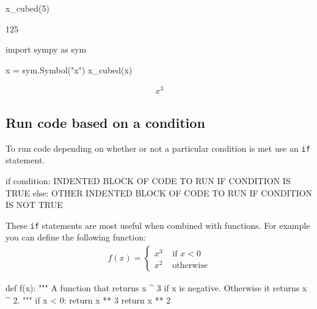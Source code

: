 \begin{pyin}
x_cubed(5)
\end{pyin}





\begin{raw}
125
\end{raw}







\begin{pyin}
import sympy as sym

x = sym.Symbol("x")
x_cubed(x)
\end{pyin}




\begin{equation*}
\begin{split}\displaystyle x^{3}\end{split}
\end{equation*}




\subsection{Run code based on a condition}
\label{\detokenize{tools-for-mathematics/06-probability/how/main:conditional-running-of-code}}

To run code depending on whether or not a particular condition is met use
an \texttt{if} statement.


\begin{raw}
if condition:
    INDENTED BLOCK OF CODE TO RUN IF CONDITION IS TRUE
else:
    OTHER INDENTED BLOCK OF CODE TO RUN IF CONDITION IS NOT TRUE
\end{raw}



These \texttt{if} statements are most useful when combined with functions. For example
you can define the following function:
\begin{equation*}
\begin{split}
    f(x) = \begin{cases}
            x ^ 3&\text{ if }x < 0\\
            x ^ 2&\text{ otherwise}
            \end{cases}
\end{split}
\end{equation*}



\begin{pyin}
def f(x):
    """
    A function that returns x ^ 3 if x is negative.
    Otherwise it returns x ^ 2.
    """
    if x < 0:
        return x ** 3
    return x ** 2
\end{pyin}







